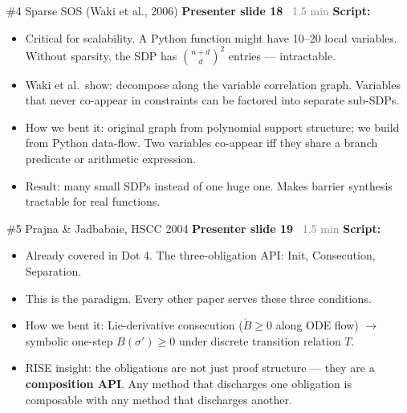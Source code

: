 \documentclass[aspectratio=169]{beamer}
\newcommand{\syncline}[2]{\textbf{#1} \hfill \textcolor{gray}{#2}}
\begin{document}
\begin{frame}{\#4 Sparse SOS (Waki et al., 2006)}
\syncline{Presenter slide 18}{~1.5 min}
\textbf{Script:}
\begin{itemize}
  \item Critical for scalability. A Python function might have 10--20 local variables. Without sparsity, the SDP has $\binom{n+d}{d}^2$ entries --- intractable.
  \item Waki et al.\ show: decompose along the variable correlation graph. Variables that never co-appear in constraints can be factored into separate sub-SDPs.
  \item How we bent it: original graph from polynomial support structure; we build from Python data-flow. Two variables co-appear iff they share a branch predicate or arithmetic expression.
  \item Result: many small SDPs instead of one huge one. Makes barrier synthesis tractable for real functions.
\end{itemize}
\end{frame}


\begin{frame}{\#5 Prajna \& Jadbabaie, HSCC 2004}
\syncline{Presenter slide 19}{~1.5 min}
\textbf{Script:}
\begin{itemize}
  \item Already covered in Dot 4. The three-obligation API: Init, Consecution, Separation.
  \item This is the paradigm. Every other paper serves these three conditions.
  \item How we bent it: Lie-derivative consecution ($\dot{B} \ge 0$ along ODE flow) $\to$ symbolic one-step $B(\sigma') \ge 0$ under discrete transition relation $T$.
  \item RISE insight: the obligations are not just proof structure --- they are a \textbf{composition API}. Any method that discharges one obligation is composable with any method that discharges another.
\end{itemize}
\end{frame}
\end{document}
